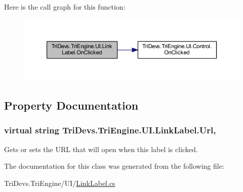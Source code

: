 Here is the call graph for this function\-:
\nopagebreak
\begin{figure}[H]
\begin{center}
\leavevmode
\includegraphics[width=350pt]{class_tri_devs_1_1_tri_engine_1_1_u_i_1_1_link_label_a66262501ea5c2901ea8d487fe790ab7c_cgraph}
\end{center}
\end{figure}




\subsection{Property Documentation}
\hypertarget{class_tri_devs_1_1_tri_engine_1_1_u_i_1_1_link_label_a7e419f9c5c50fb8f76015813bcd6f689}{
\subsubsection[{Url}]{\setlength{\rightskip}{0pt plus 5cm}virtual string Tri\-Devs.\-Tri\-Engine.\-U\-I.\-Link\-Label.\-Url\hspace{0.3cm}{\ttfamily [get]}, {\ttfamily [set]}}}\label{class_tri_devs_1_1_tri_engine_1_1_u_i_1_1_link_label_a7e419f9c5c50fb8f76015813bcd6f689}


Gets or sets the U\-R\-L that will open when this label is clicked. 



The documentation for this class was generated from the following file\-:\begin{DoxyCompactItemize}
\item 
Tri\-Devs.\-Tri\-Engine/\-U\-I/\hyperlink{_link_label_8cs}{Link\-Label.\-cs}\end{DoxyCompactItemize}
